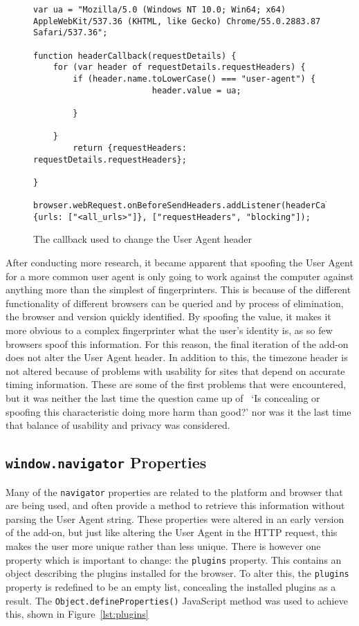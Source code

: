 \begin{figure}
\begin{lstlisting}
var ua = "Mozilla/5.0 (Windows NT 10.0; Win64; x64) AppleWebKit/537.36 (KHTML, like Gecko) Chrome/55.0.2883.87 Safari/537.36";

function headerCallback(requestDetails) {
    for (var header of requestDetails.requestHeaders) {
        if (header.name.toLowerCase() === "user-agent") {
                        header.value = ua;
                                
        }
            
    }
        return {requestHeaders: requestDetails.requestHeaders};

}

browser.webRequest.onBeforeSendHeaders.addListener(headerCallback, {urls: ["<all_urls>"]}, ["requestHeaders", "blocking"]);
\end{lstlisting}
\caption{The callback used to change the User Agent header}
\label{fig:user-agent-lst}
\end{figure}

After conducting more research, it became apparent that spoofing the User Agent for a more common user agent is only going to work against the computer against anything more than the simplest of fingerprinters.
This is because of the different functionality of different browsers can be queried and by process of elimination, the browser and version quickly identified.
By spoofing the value, it makes it more obvious to a complex fingerprinter what the user's identity is, as so few browsers spoof this information.
For this reason, the final iteration of the add-on does not alter the User Agent header.
In addition to this, the timezone header is not altered because of problems with usability for sites that depend on accurate timing information.
These are some of the first problems that were encountered, but it was neither the last time the question came up of ~`Is concealing or spoofing this characteristic doing more harm than good?' nor was it the last time that balance of usability and privacy was considered.

\subsection{\texttt{window.navigator} Properties}

Many of the \texttt{navigator} properties are related to the platform and browser that are being used, and often provide a method to retrieve this information without parsing the User Agent string.
These properties were altered in an early version of the add-on, but just like altering the User Agent in the HTTP request, this makes the user more unique rather than less unique.
There is however one property which is important to change: the \texttt{plugins} property.
This contains an object describing the plugins installed for the browser.
To alter this, the \texttt{plugins} property is redefined to be an empty list, concealing the installed plugins as a result.
The \texttt{Object.defineProperties()} JavaScript method was used to achieve this, shown in Figure~\ref{lst:plugins}

